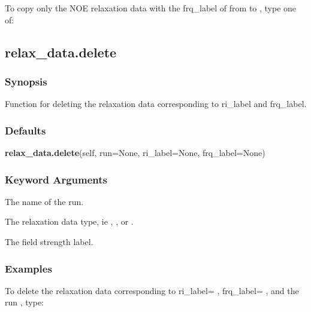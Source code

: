 


To copy only the NOE relaxation data with the frq\_label of 
 from 
 to 
, type one
of:





\newpage

\subsection{relax\_data.delete}


\subsubsection{Synopsis}

Function for deleting the relaxation data corresponding to ri\_label and frq\_label.

\subsubsection{Defaults}

\textsf{\textbf{relax\_data.delete}(self, run=None, ri\_label=None, frq\_label=None)}


\subsubsection{Keyword Arguments}


  The name of the run.

  The relaxation data type, ie 
, 
, or 
.

  The field strength label.

\subsubsection{Examples}

To delete the relaxation data corresponding to ri\_label=
, frq\_label=
, and the run
, type:

